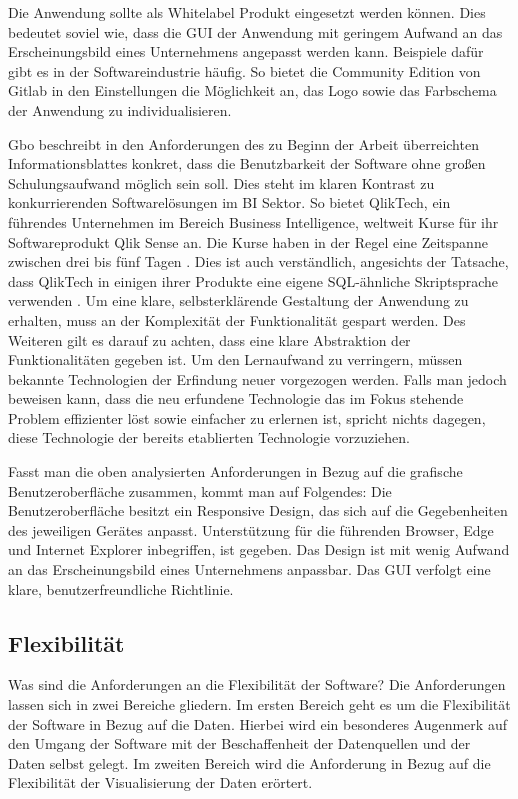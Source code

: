 Die Anwendung sollte als Whitelabel Produkt eingesetzt werden können. Dies bedeutet soviel wie,
dass die GUI der Anwendung mit geringem Aufwand an das Erscheinungsbild eines Unternehmens angepasst
werden kann. Beispiele dafür gibt es in der Softwareindustrie häufig. So bietet die Community
Edition von Gitlab in den Einstellungen die Möglichkeit an, das Logo sowie das Farbschema der Anwendung
zu individualisieren.\cite{GitlabDocs}

Gbo beschreibt in den Anforderungen des zu Beginn der Arbeit überreichten
Informationsblattes konkret, dass die Benutzbarkeit der Software ohne großen Schulungsaufwand möglich sein soll.
Dies steht im klaren Kontrast zu konkurrierenden Softwarelösungen im BI Sektor.
So bietet QlikTech, ein führendes Unternehmen im Bereich Business Intelligence,
weltweit Kurse für ihr Softwareprodukt Qlik Sense an. Die Kurse haben in der
Regel eine Zeitspanne zwischen drei bis fünf Tagen \cite{QlikSenseTraining}.
Dies ist auch verständlich, angesichts der Tatsache, dass QlikTech in einigen
ihrer Produkte eine eigene SQL-ähnliche Skriptsprache verwenden \cite{QlikSenseScriptLanguage}.
Um eine klare, selbsterklärende Gestaltung der Anwendung zu erhalten,
muss an der Komplexität der Funktionalität gespart werden. Des Weiteren
gilt es darauf zu achten, dass eine klare Abstraktion der Funktionalitäten
gegeben ist. Um den Lernaufwand zu verringern, müssen bekannte Technologien
der Erfindung neuer vorgezogen werden. Falls man jedoch beweisen kann,
dass die neu erfundene Technologie das im Fokus stehende Problem effizienter löst
sowie einfacher zu erlernen ist, spricht nichts dagegen, diese Technologie der bereits
etablierten Technologie vorzuziehen.

Fasst man die oben analysierten Anforderungen in Bezug auf die grafische Benutzeroberfläche
zusammen, kommt man auf Folgendes: Die Benutzeroberfläche besitzt ein Responsive Design,
das sich auf die Gegebenheiten des jeweiligen Gerätes anpasst. Unterstützung
für die führenden Browser, Edge und Internet Explorer inbegriffen, ist gegeben.
Das Design ist mit wenig Aufwand an das Erscheinungsbild eines Unternehmens anpassbar.
Das GUI verfolgt eine klare, benutzerfreundliche Richtlinie.

\subsection{Flexibilität}
\label{subsec:flexibilitaet}
Was sind die Anforderungen an die Flexibilität der Software? Die Anforderungen lassen sich in zwei
Bereiche gliedern. Im ersten Bereich geht es um die Flexibilität der Software in Bezug auf die Daten. Hierbei wird ein besonderes
Augenmerk auf den Umgang der Software mit der Beschaffenheit der Datenquellen und der Daten selbst gelegt. Im zweiten Bereich
wird die Anforderung in Bezug auf die Flexibilität der Visualisierung der Daten erörtert.


